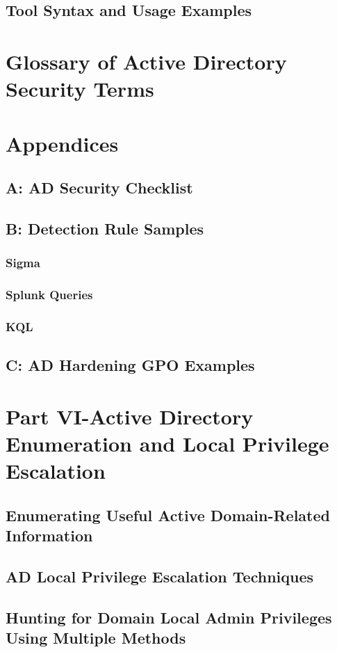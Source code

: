 \documentclass{article}
\begin{document}
\subsection{Tool Syntax and Usage Examples}

\section{Glossary of Active Directory Security Terms}

\section{Appendices}
\subsection{A: AD Security Checklist}
\subsection{B: Detection Rule Samples}
\subsubsection{Sigma}
\subsubsection{Splunk Queries}
\subsubsection{KQL}
\subsection{C: AD Hardening GPO Examples}

\section{Part VI-Active Directory Enumeration and Local Privilege Escalation}
\subsection{Enumerating Useful Active Domain-Related Information}
\subsection{AD Local Privilege Escalation Techniques}
\subsection{Hunting for Domain Local Admin Privileges Using Multiple Methods}
\end{document}
